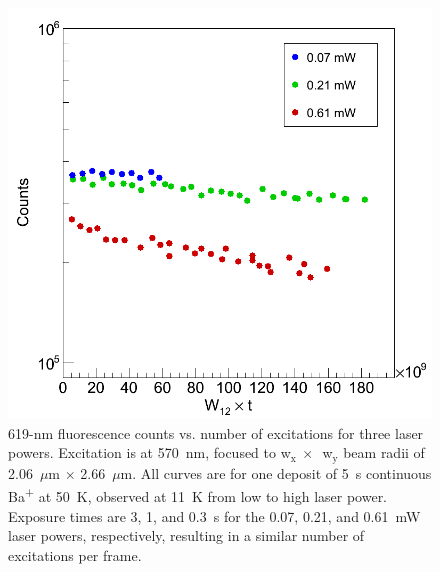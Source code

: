 
\begin{figure} %
        \centering
                \includegraphics[width=.5\textwidth]{figures/619_bleach_w12t_semilog.png}
                \caption{619-nm fluorescence counts vs. number of excitations for three laser powers.  Excitation is at 570~nm, focused to w$_{\text{x}}~\times$~w$_{\text{y}}$ beam radii of 2.06~$\mu$m $\times$ 2.66~$\mu$m. All curves are for one deposit of 5~s continuous Ba\textsuperscript{+} at 50~K, observed at 11~K from low to high laser power. Exposure times are 3, 1, and 0.3~s for the 0.07, 0.21, and 0.61~mW laser powers, respectively, resulting in a similar number of excitations per frame.}
\label{fig:bleaching619}
\end{figure}




